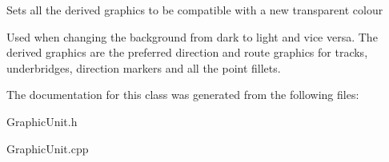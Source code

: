 Sets all the derived graphics to be compatible with a new transparent colour

Used when changing the background from dark to light and vice versa. The derived graphics are the preferred direction and route graphics for tracks, underbridges, direction markers and all the point fillets. 

The documentation for this class was generated from the following files\+:\begin{DoxyCompactItemize}
\item 
Graphic\+Unit.\+h\item 
Graphic\+Unit.\+cpp\end{DoxyCompactItemize}
